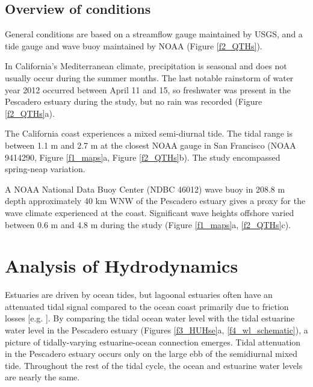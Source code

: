\subsection{Overview of conditions\label{sub:ext_cond}}

General conditions are based on a streamflow gauge maintained by USGS,
and a tide gauge and wave buoy maintained by NOAA (Figure \ref{f2_QTHs}). 

In California's Mediterranean climate, precipitation is seasonal and
does not usually occur during the summer months. The last notable
rainstorm of water year 2012 occurred between April 11 and 15, so
freshwater was present in the Pescadero estuary during the study,
but no rain was recorded (Figure \ref{f2_QTHs}a). 

The California coast experiences a mixed semi-diurnal tide. The tidal
range is between 1.1 m and 2.7 m at the closest NOAA gauge in San
Francisco (NOAA 9414290, Figure \ref{f1_maps}a, Figure \ref{f2_QTHs}b).
The study encompassed spring-neap variation.

A NOAA National Data Buoy Center (NDBC 46012)\emph{ }wave buoy in
208.8 m depth approximately 40 km WNW of the Pescadero estuary gives
a proxy for the wave climate experienced at the coast. Significant
wave heights offshore varied between 0.6 m and 4.8 m during the study
(Figure \ref{f1_maps}a, \ref{f2_QTHs}c). 





\section{Analysis of Hydrodynamics}

Estuaries are driven by ocean tides, but lagoonal estuaries often
have an attenuated tidal signal compared to the ocean coast primarily
due to friction losses {[}e.g. \citealp{rydberg_tidal_1996}{]}.
By comparing the tidal ocean water level with the tidal estuarine
water level in the Pescadero estuary (Figures \ref{f3_HUHse}a, \ref{f4_wl_schematic}),
a picture of tidally-varying estuarine-ocean connection emerges. Tidal
attenuation in the Pescadero estuary occurs only on the large ebb
of the semidiurnal mixed tide. Throughout the rest of the tidal cycle,
the ocean and estuarine water levels are nearly the same.


